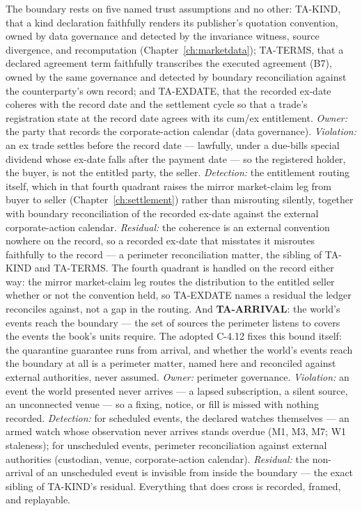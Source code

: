 \documentclass[11pt,a4paper]{article}
\begin{document}
The boundary rests on five named trust assumptions and no other: TA-KIND, that a kind
declaration faithfully renders its publisher's quotation convention, owned by data
governance and detected by the invariance witness, source divergence, and recomputation
(Chapter~\ref{ch:marketdata}); TA-TERMS, that a declared agreement term faithfully
transcribes the executed agreement (B7), owned by the same governance and detected by
boundary reconciliation against the counterparty's own record; and TA-EXDATE, that the
recorded ex-date coheres with the record date and the settlement cycle so that a trade's
registration state at the record date agrees with its cum/ex entitlement. \emph{Owner:}
the party that records the corporate-action calendar (data governance). \emph{Violation:}
an ex trade settles before the record date --- lawfully, under a due-bills special dividend
whose ex-date falls after the payment date --- so the registered holder, the buyer, is not
the entitled party, the seller. \emph{Detection:} the entitlement routing itself, which in
that fourth quadrant raises the mirror market-claim leg from buyer to seller
(Chapter~\ref{ch:settlement}) rather than misrouting silently, together with boundary
reconciliation of the recorded ex-date against the external corporate-action calendar.
\emph{Residual:} the coherence is an external convention nowhere on the record, so a
recorded ex-date that misstates it misroutes faithfully to the record --- a perimeter
reconciliation matter, the sibling of TA-KIND and TA-TERMS. The fourth quadrant is handled
on the record either way: the mirror market-claim leg routes the distribution to the
entitled seller whether or not the convention held, so TA-EXDATE names a residual the
ledger reconciles against, not a gap in the routing. And \textbf{TA-ARRIVAL}: the world's
events reach the boundary --- the set of sources the perimeter listens to covers the
events the book's units require. The adopted C-4.12 fixes this bound itself: the
quarantine guarantee runs from arrival, and whether the world's events reach the boundary
at all is a perimeter matter, named here and reconciled against external authorities,
never assumed. \emph{Owner:} perimeter governance. \emph{Violation:} an event the world
presented never arrives --- a lapsed subscription, a silent source, an unconnected venue
--- so a fixing, notice, or fill is missed with nothing recorded. \emph{Detection:} for
scheduled events, the declared watches themselves --- an armed watch whose observation
never arrives stands overdue (M1, M3, M7; W1 staleness); for unscheduled events, perimeter
reconciliation against external authorities (custodian, venue, corporate-action calendar).
\emph{Residual:} the non-arrival of an unscheduled event is invisible from inside the
boundary --- the exact sibling of TA-KIND's residual. Everything that does cross is
recorded, framed, and replayable.
\end{document}
